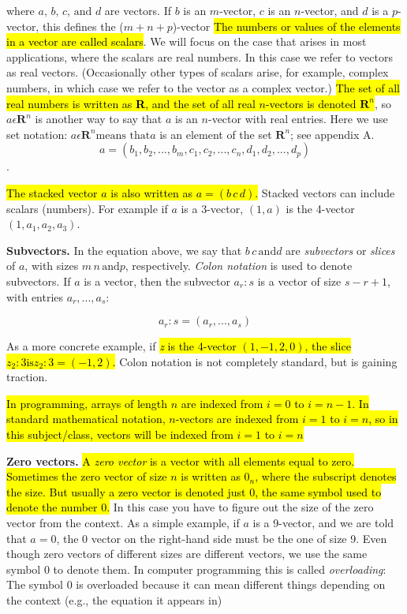 \documentclass[11pt,oneside,a4paper,openright]{article}
\begin{document}
where $a\text{, } b\text{, } c\text{, } \text{and } d$ are vectors. If $b$ is an $m$-vector, $c$ is an $n$-vector, and $d$ is a $p$-vector, this defines the ($m + n + p$)-vector
\hl{The numbers or values of the elements in a vector are called scalars}. We will focus on the case that arises in most applications, where the scalars are real numbers. In this case we refer to vectors as real vectors. (Occasionally other types of scalars arise, for example, complex numbers, in which case we refer to the vector as a complex vector.) \hl{The set of all real numbers is written as \textbf{R}, and the set of all real $n$-vectors is denoted $\textbf{R}^n$}, so $a \epsilon \textbf{R}^n $ is another way to say that $a$ is an $n$-vector with real entries. Here we use set notation: $a \epsilon \textbf{R}^n \text{means that} a$ is an element of the set $\textbf{R}^n$; see appendix A.
\begin{equation}
	a = (b_1, b_2, . . . , b_m, c_1, c_2, . . . , c_n, d_1, d_2, . . . , d_p)
\end{equation}.

\hl{The stacked vector $a$ is also written as $a = (b\, c\, d)$.}
Stacked vectors can include scalars (numbers). For example if $a$ is a 3-vector,
$(1, a)$ is the 4-vector $(1, a_1, a_2, a_3)$.

\textbf{Subvectors.} In the equation above, we say that $b \, c\, \text{and} d$ are \emph{subvectors} or \emph{slices} of $a$, with sizes $m\, n\, \text{and} p$, respectively. \emph{Colon notation} is used to denote subvectors. If $a$ is a vector, then the subvector $a_r:s$ is a vector of size $s - r + 1$, with entries $a_r, . . . , a_s$:

\begin{equation}
    a_r:s = (a_r, . . . , a_s)  
\end{equation}


As a more concrete example, if \hl{\emph{z} is the 4-vector $(1, -1, 2, 0)$, the slice $z_2:3 \text{is} z_2:3 = (-1, 2).$} Colon notation is not completely standard, but is gaining traction.

\hl{In programming, arrays of length $n$ are indexed from $i = 0$ to $i=n-1$. In standard mathematical notation, $n$-vectors are indexed from $i = 1$ to $i = n$, so in this subject/class, vectors will be indexed from $i = 1$ to $i = n$}

\textbf{Zero vectors.} \hl{A \emph{zero vector} is a vector with all elements equal to zero. Sometimes the zero vector of size $n$ is written as $0_n$, where the subscript denotes the size. But usually a zero vector is denoted just 0, the same symbol used to denote the number 0.} In this case you have to figure out the size of the zero vector from the context. As a simple example, if $a$ is a 9-vector, and we are told that $a = 0$, the 0 vector on the right-hand side must be the one of size 9.
Even though zero vectors of different sizes are different vectors, we use the same symbol 0 to denote them. In computer programming this is called \emph{overloading}: 
The symbol 0 is overloaded because it can mean different things depending on the context (e.g., the equation it appears in)
\end{document}
